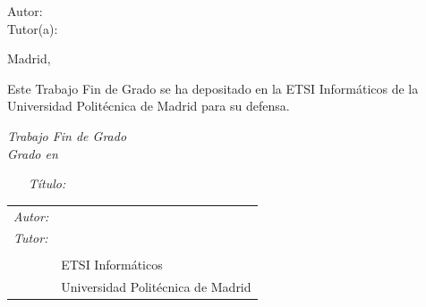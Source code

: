 \begin{titlepage}
\vspace*{0.5cm}
\begin{center}
\huge\bfseries {  \TituloTFG{} } 
\end{center}

\vspace*{5cm}

\noindent
\large{Autor: \NombreAutor{} }\\
\large{Tutor(a): \NombreTutor{} }


\vspace*{4cm}
\begin{center}
Madrid, \Fecha
\end{center}

\newpage
\thispagestyle{empty}
\noindent
Este Trabajo Fin de Grado se ha depositado en la ETSI Informáticos de la Universidad Politécnica de Madrid para su defensa.

\vspace*{4cm}
\noindent
\textit{Trabajo Fin de Grado}\\
\textit{Grado en} \Grado{}

\begin{enumerate}
\item[\textit{Título:}] \TituloTFG{}
\end{enumerate}
\Fecha


\vspace*{3cm}

\noindent
\begin{tabular}{ll}
\textit{Autor:} & \NombreAutor{}  \\ 
\textit{Tutor:} & \NombreTutor{}  \\ 
                & \Departamento{} \\
                & ETSI Informáticos\\
                & Universidad Politécnica de Madrid
\end{tabular} 

\end{titlepage}
